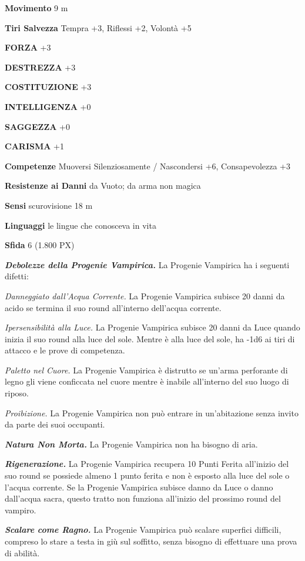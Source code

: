 \begin{multicols}{2}
	\textbf{Movimento} 9 m

	\textbf{Tiri Salvezza} Tempra +3, Riflessi +2, Volontà +5

	\textbf{FORZA} +3

	\textbf{DESTREZZA} +3

	\textbf{COSTITUZIONE} +3

	\textbf{INTELLIGENZA} +0

	\textbf{SAGGEZZA} +0

	\textbf{CARISMA} +1

	\textbf{Competenze} Muoversi Silenziosamente / Nascondersi +6, Consapevolezza +3

	\textbf{Resistenze ai Danni} da Vuoto; da arma non magica

	\textbf{Sensi} scurovisione 18 m

	\textbf{Linguaggi} le lingue che conosceva in vita

	\textbf{Sfida} 6 (1.800 PX)

	\textit{\textbf{Debolezze della Progenie Vampirica.}} La Progenie Vampirica ha i seguenti difetti:

	\textit{Danneggiato dall'Acqua Corrente.} La Progenie Vampirica subisce 20 danni da acido se termina il suo round all'interno dell'acqua corrente.

	\textit{Ipersensibilità alla Luce.} La Progenie Vampirica subisce 20 danni da Luce quando inizia il suo round alla luce del sole. Mentre è alla luce del sole, ha -1d6 ai tiri di attacco e le prove di competenza.

	\textit{Paletto nel Cuore.} La Progenie Vampirica è distrutto se un'arma perforante di legno gli viene conficcata nel cuore mentre è inabile all'interno del suo luogo di riposo.

	\textit{Proibizione.} La Progenie Vampirica non può entrare in un'abitazione senza invito da parte dei suoi occupanti.

	\textit{\textbf{Natura Non Morta.}} La Progenie Vampirica non ha bisogno di aria.

	\textit{\textbf{Rigenerazione.}} La Progenie Vampirica recupera 10 Punti Ferita all'inizio del suo round se possiede almeno 1 punto ferita e non è esposto alla luce del sole o l'acqua corrente. Se la Progenie Vampirica subisce danno da Luce o danno dall'acqua sacra, questo tratto non funziona all'inizio del prossimo round del vampiro.

	\textit{\textbf{Scalare come Ragno.}} La Progenie Vampirica può scalare superfici difficili, compreso lo stare a testa in giù sul soffitto, senza bisogno di effettuare una prova di abilità.


\end{multicols}

